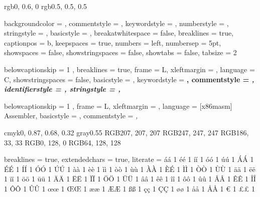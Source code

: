 
\definecolor{codegreen} {rgb}{0, 0.6, 0}
\definecolor{codegray}    {rgb}{0.5, 0.5, 0.5}

{
    backgroundcolor = \color{backcolour},
    commentstyle = \color{codegreen},
    keywordstyle = \color{magenta},
    numberstyle = \tiny\color{codegray},
    stringstyle = \color{codepurple},
    basicstyle = \ttfamily \footnotesize,
    breakatwhitespace = false,
    breaklines = true,
    captionpos = b,
    keepspaces = true,
    numbers = left,
    numbersep = 5pt,
    showspaces = false,
    showstringspaces = false,
    showtabs = false,
    tabsize = 2
}


{
    belowcaptionskip = 1 \baselineskip,
    breaklines = true,
    frame = L,
    xleftmargin = \parindent,
    language = C,
    showstringspaces = false,
    basicstyle = \footnotesize \ttfamily,
    keywordstyle = \bfseries \color{green!40!black},
    commentstyle = \itshape \color{purple!40!black},
    identifierstyle = \color{blue},
    stringstyle = \color{orange},
}

{
    belowcaptionskip = 1 \baselineskip,
    frame = L,
    xleftmargin = \parindent,
    language = [x86masm] Assembler,
    basicstyle = \footnotesize\ttfamily,
    commentstyle = \itshape\color{purple!40!black},
}


\definecolor{maroon}        {cmyk}{0, 0.87, 0.68, 0.32}
\definecolor{halfgray}      {gray}{0.55}
\definecolor{ipython_frame} {RGB}{207, 207, 207}
\definecolor{ipython_bg}    {RGB}{247, 247, 247}
\definecolor{ipython_red}   {RGB}{186, 33, 33}
\definecolor{ipython_green} {RGB}{0, 128, 0}
\definecolor{ipython_cyan}  {RGB}{64, 128, 128}

{
    breaklines = true,
    extendedchars = true,
    literate =
    {á}{{\' a}} 1 {é}{{\' e}} 1 {í}{{\' i}} 1 {ó}{{\' o}} 1 {ú}{{\' u}} 1
    {Á}{{\' A}} 1 {É}{{\' E}} 1 {Í}{{\' I}} 1 {Ó}{{\' O}} 1 {Ú}{{\' U}} 1
    {à}{{\` a}} 1 {è}{{\` e}} 1 {ì}{{\` i}} 1 {ò}{{\` o}} 1 {ù}{{\` u}} 1
    {À}{{\` A}} 1 {È}{{\' E}} 1 {Ì}{{\` I}} 1 {Ò}{{\` O}} 1 {Ù}{{\` U}} 1
    {ä}{{\" a}} 1 {ë}{{\" e}} 1 {ï}{{\" i}} 1 {ö}{{\" o}} 1 {ü}{{\" u}} 1
    {Ä}{{\" A}} 1 {Ë}{{\" E}} 1 {Ï}{{\" I}} 1 {Ö}{{\" O}} 1 {Ü}{{\" U}} 1
    {â}{{\^ a}} 1 {ê}{{\^ e}} 1 {î}{{\^ i}} 1 {ô}{{\^ o}} 1 {û}{{\^ u}} 1
    {Â}{{\^ A}} 1 {Ê}{{\^ E}} 1 {Î}{{\^ I}} 1 {Ô}{{\^ O}} 1 {Û}{{\^ U}} 1
    {œ}{{\oe}}  1 {Œ}{{\OE}}  1 {æ}{{\ae}}  1 {Æ}{{\AE}}  1 {ß}{{\ss}}  1
    {ç}{{\c c}} 1 {Ç}{{\c C}} 1 {ø}{{\o}} 1 {å}{{\r a}} 1 {Å}{{\r A}} 1
    {€}{{\EUR}} 1 {£}{{\pounds}} 1
}


